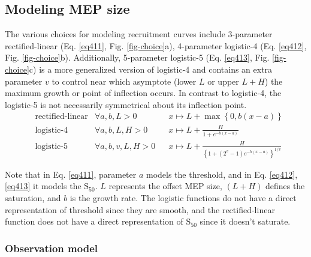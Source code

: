 \documentclass[sn-mathphys-ay]{sn-jnl}%
\theoremstyle{thmstyleone}%
\theoremstyle{thmstyletwo}%
\theoremstyle{thmstylethree}%
\begin{document}
\subsection{Modeling MEP size}\label{modeling}
The various choices for modeling recruitment curves include 3-parameter rectified-linear \cite{willer_hypoxia_1987,devanne_input-output_1997,malone_closed-loop_2022-1,mcintosh_intraoperative_2023} (Eq. \ref{eq411}, Fig. \ref{fig-choice}a), 4-parameter logistic-4 \cite{devanne_input-output_1997,kukke_efficient_2014} (Eq. \ref{eq412}, Fig. \ref{fig-choice}b). Additionally, 5-parameter logistic-5 \cite{pitcher_age_2003} (Eq. \ref{eq413}, Fig. \ref{fig-choice}c) is a more generalized version of logistic-4 and contains an extra parameter $v$ to control near which asymptote (lower $L$ or upper $L + H$) the maximum growth or point of inflection occurs. In contrast to logistic-4, the logistic-5 is not necessarily symmetrical about its inflection point.
\begin{align}
    &\text{rectified-linear} & \forall a, b, L > 0\ \;\;&x \mapsto L + \max\left\{0, b\left(x - a\right)\right\}  \label{eq411}\\
    &\text{logistic-4} & \forall a, b, L, H > 0\ \;\;&x \mapsto L + \frac{H}{1 + e^{-b\left(x-a\right)}}  \label{eq412}\\
    &\text{logistic-5} & \forall a, b, v, L, H > 0\ \;\;&x \mapsto L + \frac{H}{\left\{1 + \left(2^v - 1\right)e^{-b\left(x-a\right)}\right\}^{1/v}}  \label{eq413}
\end{align}

Note that in Eq. \ref{eq411}, parameter $a$ models the threshold, and in Eq. \ref{eq412}, \ref{eq413} it models the $\text{S}_{50}$. $L$ represents the offset MEP size, $\left(L + H\right)$ defines the saturation, and $b$ is the growth rate. The logistic functions do not have a direct representation of threshold since they are smooth, and the rectified-linear function does not have a direct representation of $\text{S}_{50}$ since it doesn’t saturate.

\subsubsection{Observation model}
\end{document}
